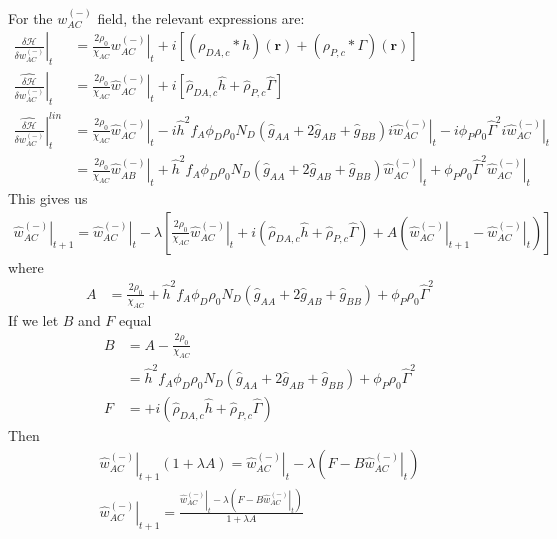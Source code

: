 \documentclass{article}
\begin{document}
For the $w_{AC}^{(-)}$ field, the relevant expressions are:
\begin{align*}
  \left. \frac{\delta \mathcal{H}}{\delta  w_{AC}^{(-)} } \right|_t &=
    \frac{2\rho_0}{\chi_{AC}} \left. w_{AC}^{(-)} \right|_t
    + i [ (\rho_{DA,c} \ast h)(\mathbf{r})
          + (\rho_{P,c} \ast \Gamma)(\mathbf{r}) ] \\
    \left. \hat{\frac{\delta \mathcal{H}}{\delta w_{AC}^{(-)}}} \right|_t &=
    \frac{2\rho_0}{\chi_{AC}} \left. \hat{w}_{AC}^{(-)} \right|_t
    + i [ \hat{\rho}_{DA,c} \hat{h}
          + \hat{\rho}_{P,c}  \hat{\Gamma} ] \\
  \left. \hat{\frac{\delta \mathcal{H}}{\delta w_{AC}^{(-)}}} \right| ^{lin}_t &=
    \frac{2\rho_0}{\chi_{AC}} \left. \hat{w}_{AC}^{(-)} \right|_t
    - i \hat{h}^2 f_A \phi_D \rho_0 N_D
      (\hat{g}_{AA} + 2 \hat{g}_{AB} + \hat{g}_{BB}) i \left.
        \hat{w}_{AC}^{(-)} \right|_t
    - i \phi_P \rho_0 \hat{\Gamma}^2 i \left. \hat{w}_{AC}^{(-)} \right|_t \\
  &= \frac{2\rho_0}{\chi_{AC}} \left. \hat{w}_{AB}^{(-)} \right|_t
    + \hat{h}^2 f_A \phi_D \rho_0 N_D
      (\hat{g}_{AA} + 2 \hat{g}_{AB} + \hat{g}_{BB})
        \left. \hat{w}_{AC}^{(-)} \right|_t
    + \phi_P \rho_0 \hat{\Gamma}^2 \left. \hat{w}_{AC}^{(-)} \right|_t
\end{align*}
This gives us
\begin{align*}
  \left. \hat{w}_{AC}^{(-)} \right|_{t+1} =
    \left. \hat{w}_{AC}^{(-)} \right|_t - \lambda \left[
      \frac{2\rho_0}{\chi_{AC}} \left. \hat{w}_{AC}^{(-)} \right|_t
      + i ( \hat{\rho}_{DA,c} \hat{h}
            + \hat{\rho}_{P,c}  \hat{\Gamma} )
      + A ( \left. \hat{w}_{AC}^{(-)} \right|_{t+1}
            - \left. \hat{w}_{AC}^{(-)} \right|_t)
    \right]
\end{align*}
where
\begin{align*}
  A &=
  \frac{2\rho_0}{\chi_{AC}}
      + \hat{h}^2 f_A \phi_D \rho_0 N_D
        (\hat{g}_{AA} + 2 \hat{g}_{AB} + \hat{g}_{BB})
      + \phi_P \rho_0 \hat{\Gamma}^2
\end{align*}
If we let $B$ and $F$ equal
\begin{align*}
  B &= A - \frac{2\rho_0}{\chi_{AC}} \\
    &= \hat{h}^2 f_A \phi_D \rho_0 N_D
        (\hat{g}_{AA} + 2 \hat{g}_{AB} + \hat{g}_{BB})
      + \phi_P \rho_0 \hat{\Gamma}^2 \\
  F &= + i ( \hat{\rho}_{DA,c} \hat{h}
            + \hat{\rho}_{P,c}  \hat{\Gamma} )
\end{align*}
Then
\begin{align*}
  \left. \hat{w}_{AC}^{(-)} \right|_{t+1} ( 1 + \lambda A ) =
    \left. \hat{w}_{AC}^{(-)} \right|_t
    - \lambda \left( F - B \left. \hat{w}_{AC}^{(-)} \right|_t \right) \\
  \left. \hat{w}_{AC}^{(-)} \right|_{t+1} =
  \frac{\left. \hat{w}_{AC}^{(-)} \right|_t - \lambda
          \left( F - B \left. \hat{w}_{AC}^{(-)} \right|_t \right)}
       {1 + \lambda A}
\end{align*}
\end{document}
